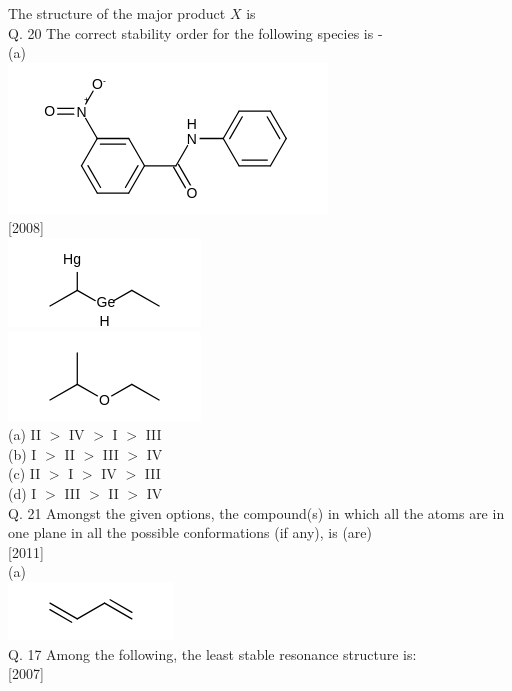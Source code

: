 \documentclass[10pt]{article}
\begin{document}
The structure of the major product $X$ is\\
Q. 20 The correct stability order for the following species is -\\
(a)\\
\includegraphics{smile-c69fbb0242a85342028aa0915a7194d2144eef3d}\\[0pt]
[2008]\\
\includegraphics{smile-4b1858411e9e8d2c03e9064a7fd1f25011212c90}\\
\includegraphics{smile-af7046a141e578b91c9fd012835cf80c07cb0893}\\
(a) II $>$ IV $>$ I $>$ III\\
(b) I $>$ II $>$ III $>$ IV\\
(c) II $>$ I $>$ IV $>$ III\\
(d) I $>$ III $>$ II $>$ IV\\
Q. 21 Amongst the given options, the compound(s) in which all the atoms are in one plane in all the possible conformations (if any), is (are)\\[0pt]
[2011]\\
(a)\\
\includegraphics{smile-4b740d1c5823dc549aeecd9e9c499614fb7eff81}\\
Q. 17 Among the following, the least stable resonance structure is:\\[0pt]
[2007]\\
\end{document}
